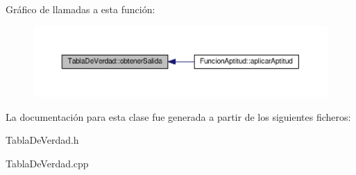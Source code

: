 Gráfico de llamadas a esta función\-:\nopagebreak
\begin{figure}[H]
\begin{center}
\leavevmode
\includegraphics[width=350pt]{classTablaDeVerdad_a3e53eabc4e37d9514141f4afacc1e915_icgraph}
\end{center}
\end{figure}




La documentación para esta clase fue generada a partir de los siguientes ficheros\-:\begin{DoxyCompactItemize}
\item 
Tabla\-De\-Verdad.\-h\item 
Tabla\-De\-Verdad.\-cpp\end{DoxyCompactItemize}
